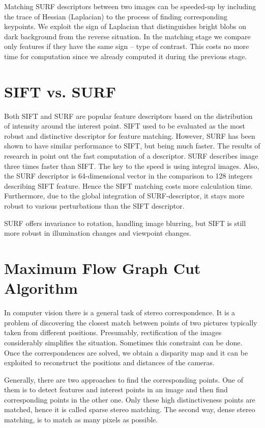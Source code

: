 Matching SURF descriptors between two images can be speeded-up by including the trace of Hessian (Laplacian) to the process of finding corresponding keypoints.
We exploit the sign of Laplacian that distinguishes bright blobs on dark background from the reverse situation.
In the matching stage we compare only features if they have the same sign -- type of contrast. 
This costs no more time for computation since we already computed it during the previous stage.

\section{SIFT vs. SURF}
Both SIFT and SURF are popular feature descriptors based on the distribution of intensity around the interest point.
SIFT used to be evaluated as the most robust and distinctive descriptor for feature matching.
However, SURF has been shown to have similar performance to SIFT, but being much faster.
The results of research in \cite{surf2006} point out the fast computation of a descriptor.
SURF describes image three times faster than SIFT.
The key to the speed is using integral images. 
Also, the SURF descriptor is 64-dimensional vector in the comparison to 128 integers describing SIFT feature.
Hence the SIFT matching costs more calculation time.
Furthermore, due to the global integration of SURF-descriptor, it stays more robust to various perturbations than the SIFT descriptor.

SURF offers invariance to rotation, handling image blurring, but SIFT is still more robust in illumination changes and viewpoint changes.


\section{Maximum Flow Graph Cut Algorithm}
In computer vision there is a general task of stereo correspondence.
It is a problem of discovering the closest match between points of two pictures typically taken from different positions.
Presumably, rectification of the images considerably simplifies the situation. 
Sometimes this constraint can be done.
Once the correspondences are solved, we obtain a disparity map and it can be exploited to reconstruct the positions and distances of the cameras.

Generally, there are two approaches to find the corresponding points.
One of them is to detect features and interest points in an image and then find corresponding points in the other one.
Only these high distinctiveness points are matched, hence it is called sparse stereo matching.
The second way, dense stereo matching, is to match as many pixels as possible.

